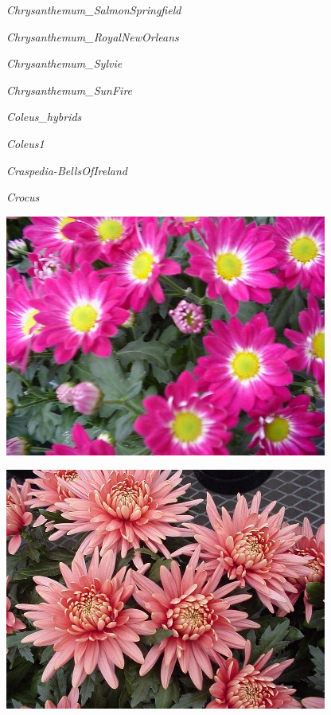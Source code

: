 \documentclass{article}
\begin{document}
\noindent
\vfill
\centerline{{\Large\emph{Chrysanthemum_SalmonSpringfield}}}
\vfill
\newpage

\noindent
\vfill
\centerline{{\Large\emph{Chrysanthemum_RoyalNewOrleans}}}
\vfill
\newpage

\noindent
\vfill
\centerline{{\Large\emph{Chrysanthemum_Sylvie}}}
\vfill
\newpage

\noindent
\vfill
\centerline{{\Large\emph{Chrysanthemum_SunFire}}}
\vfill
\newpage

\noindent
\vfill
\centerline{{\Large\emph{Coleus_hybrids}}}
\vfill
\newpage

\noindent
\vfill
\centerline{{\Large\emph{Coleus1}}}
\vfill
\newpage

\noindent
\vfill
\centerline{{\Large\emph{Craspedia-BellsOfIreland}}}
\vfill
\newpage

\noindent
\vfill
\centerline{{\Large\emph{Crocus}}}
\vfill
\newpage

\begin{center}
\includegraphics[height=0.9\textheight, angle=90]{../Chrysanthemum_RoyalNewOrleans.jpg}
\end{center}
\newpage

\begin{center}
\includegraphics[height=0.9\textheight, angle=90]{../Chrysanthemum_SalmonSpringfield.jpg}
\end{center}
\newpage
\end{document}

